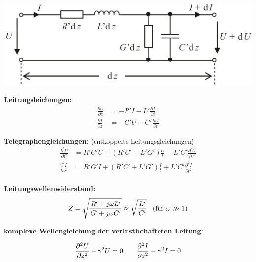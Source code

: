 \documentclass[german]{latex4ei/latex4ei_sheet}
\begin{document}
\includegraphics[width = \columnwidth]{images/leitung.png}

\begin{sectionbox}
    

    \textbf{Leitungsleichungen:}
    \begin{equation*}
        \begin{aligned}
            \frac{\partial U}{\partial z} &= -R' I - L' \frac{\partial I}{\partial t} \\
            \frac{\partial I}{\partial z} &= -G' U - C' \frac{\partial U}{\partial t}
        \end{aligned}
    \end{equation*}

    \textbf{Telegraphengleichungen:} (entkoppelte Leitungsgleichungen)
    \begin{equation*}
        \begin{aligned}
            \frac{\partial^2 U}{\partial z^2} &= R' G' U + (R'C'+L'G') \frac{U}{t} + L'C' \frac{\partial^2 U}{\partial t^2} \\
            \frac{\partial^2 I}{\partial z^2} &= R' G' I + (R'C'+L'G') \frac{I}{t} + L'C' \frac{\partial^2 I}{\partial t^2} \\
        \end{aligned}
    \end{equation*}

    \textbf{Leitungswellenwiderstand:}
    \begin{equation*}
        Z = \sqrt{\frac{R' + j \omega L'}{G' + j \omega C'}} \approx \sqrt{\frac{L'}{C'}} \hspace{3mm} \text{(für $\omega \gg 1$)}    
    \end{equation*}

\textbf{komplexe Wellengleichung der verlustbehafteten Leitung:}


\begin{equation*}
    \frac{\partial^2 U}{\partial z^2} - \gamma^2 U = 0 \hspace{7mm}
    \frac{\partial^2 I}{\partial z^2} - \gamma^2 I = 0
\end{equation*}


\end{sectionbox}
\end{document}
